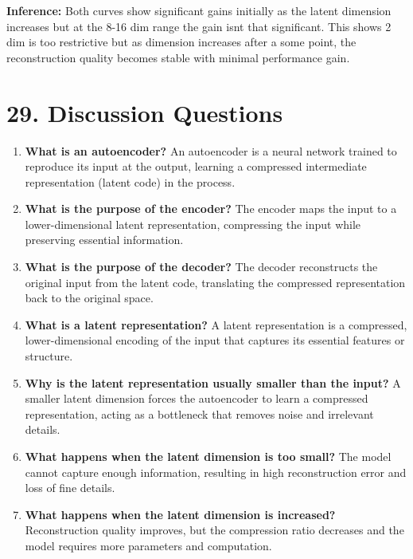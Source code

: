 \documentclass[10pt]{article}
\begin{document}
\textbf{Inference:} Both curves show significant gains initially as the latent dimension increases but at the 8-16 dim range the gain isnt that significant. This shows 2 dim is too restrictive but as dimension increases after a some point, the reconstruction quality becomes stable with  minimal performance gain.

\section*{29. Discussion Questions}

\begin{enumerate}

\item \textbf{What is an autoencoder?} An autoencoder is a neural network
trained to reproduce its input at the output, learning a compressed
intermediate representation (latent code) in the process.

\item \textbf{What is the purpose of the encoder?} The encoder maps the
input to a lower-dimensional latent representation, compressing the input
while preserving essential information.

\item \textbf{What is the purpose of the decoder?} The decoder reconstructs
the original input from the latent code, translating the compressed
representation back to the original space.

\item \textbf{What is a latent representation?} A latent representation is
a compressed, lower-dimensional encoding of the input that captures its
essential features or structure.

\item \textbf{Why is the latent representation usually smaller than the
input?} A smaller latent dimension forces the autoencoder to learn a
compressed representation, acting as a bottleneck that removes noise and
irrelevant details.

\item \textbf{What happens when the latent dimension is too small?} The
model cannot capture enough information, resulting in high reconstruction
error and loss of fine details.

\item \textbf{What happens when the latent dimension is increased?}
Reconstruction quality improves, but the compression ratio decreases and
the model requires more parameters and computation.


\end{enumerate}
\end{document}
